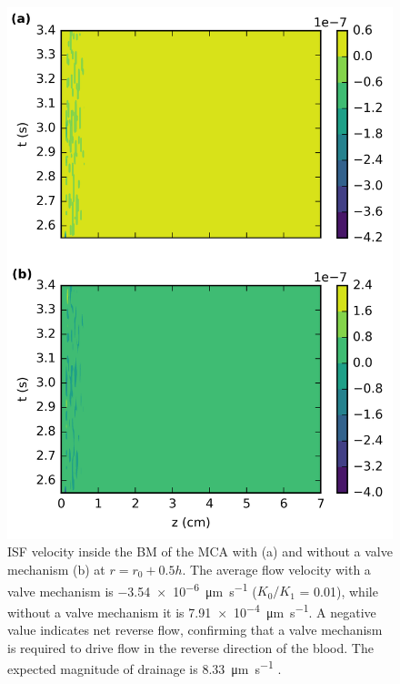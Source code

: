\documentclass[a4paper,titlepage]{scrartcl}
\begin{document}
\begin{figure}
\centerline{\includegraphics{figures/bm_velocity.png}}
\caption{ISF velocity inside the BM of the MCA with (a) and without a valve mechanism (b) at $r = r_0 + 0.5h$. The average flow velocity with a valve mechanism is \SI{-3.54e-6}{\micro\metre\per\second} ($K_0/K_1$ = 0.01), while without a valve mechanism it is \SI{7.91e-4}{\micro\metre\per\second}. A negative value indicates net reverse flow, confirming that a valve mechanism is required to drive flow in the reverse direction of the blood. The expected magnitude of drainage is \SI{8.33}{\micro\metre\per\second} \cite{Carare2008}.\label{fig:bm_velocity}}
\end{figure}
\end{document}
